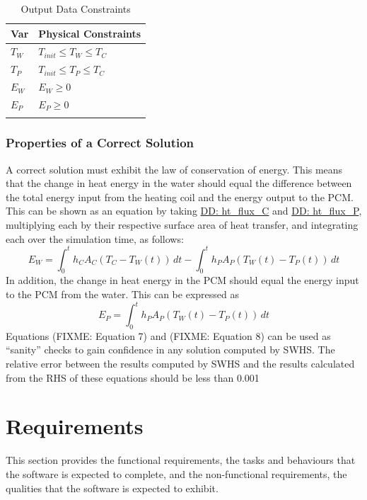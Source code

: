 \documentclass[12pt]{article}
\begin{document}
\begin{longtable}{l l}
\toprule
Var & Physical Constraints
\\
\midrule
\endhead
${T_{W}}$ & ${T_{init}}\leq{}{T_{W}}\leq{}{T_{C}}$
\\
${T_{P}}$ & ${T_{init}}\leq{}{T_{P}}\leq{}{T_{C}}$
\\
${E_{W}}$ & ${E_{W}}\geq{}0$
\\
${E_{P}}$ & ${E_{P}}\geq{}0$
\\
\bottomrule
\caption{Output Data Constraints}
\label{Table:OutDataConstraints}
\end{longtable}
\subsubsection{Properties of a Correct Solution}
\label{Sec:CorSolProps}
A correct solution must exhibit the law of conservation of energy. This means that the change in heat energy in the water should equal the difference between the total energy input from the heating coil and the energy output to the PCM. This can be shown as an equation by taking \hyperref[DD:ht.flux.C]{DD: ht\_flux\_C} and \hyperref[DD:ht.flux.P]{DD: ht\_flux\_P}, multiplying each by their respective surface area of heat transfer, and integrating each over the simulation time, as follows:
\begin{displaymath}
{E_{W}}=\int_{0}^{t}{{h_{C}} {A_{C}} \left({T_{C}}-{T_{W}}\left(t\right)\right)}\,dt-\int_{0}^{t}{{h_{P}} {A_{P}} \left({T_{W}}\left(t\right)-{T_{P}}\left(t\right)\right)}\,dt
\end{displaymath}
In addition, the change in heat energy in the PCM should equal the energy input to the PCM from the water. This can be expressed as
\begin{displaymath}
{E_{P}}=\int_{0}^{t}{{h_{P}} {A_{P}} \left({T_{W}}\left(t\right)-{T_{P}}\left(t\right)\right)}\,dt
\end{displaymath}
Equations (FIXME: Equation 7) and (FIXME: Equation 8) can be used as ``sanity'' checks to gain confidence in any solution computed by SWHS. The relative error between the results computed by SWHS and the results calculated from the RHS of these equations should be less than 0.001%
\section{Requirements}
\label{Sec:Requirements}
This section provides the functional requirements, the tasks and behaviours that the software is expected to complete, and the non-functional requirements, the qualities that the software is expected to exhibit.
\end{document}
